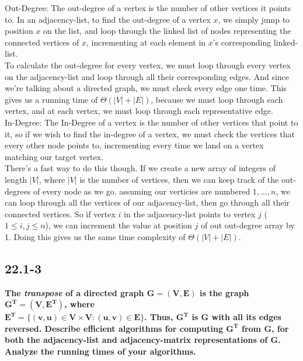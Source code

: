 \documentclass[11pt]{article}
\begin{document}
 Out-Degree: The out-degree of a vertex is the number of other vertices it points to.  In an 
 adjacency-list, to find the out-degree of a vertex $x$, we simply jump to position $x$ on the 
 list, and loop through the linked list of nodes representing the connected vertices of $x$, 
 incrementing at each element in $x$'s corresponding linked-list. \\

 To calculate the out-degree for every vertex, we must loop through every vertex on the 
 adjacency-list and loop through all their corresponding edges.  And since we're talking about a 
 directed graph, we must check every edge one time.  This gives us a running time of 
 \(\Theta(|V| + |E|)\), because we must loop through each vertex, and at each vertex, we must 
 loop through each representative edge. \\

 In-Degree: The In-Degree of a vertex is the number of other vertices that point to it, so if we 
 wish to find the in-degree of a vertex, we must check the vertices that every other node points 
 to, incrementing every time we land on a vertex matching our target vertex.  \\ 

 There's a fast way to do this though.  If we create a new array of integers of length $|V|$, where 
 $|V|$ is the number of vertices, then we can keep track of the out-degrees of every node as we go. 
 assuming our verticies are numbered $1,\dots,n$, we can loop through all the vertices of our 
 adjacency-list, then go through all their connected vertices.  So if vertex $i$ in the 
 adjacency-list points to vertex $j$ (\(1 \leq i,j \leq n\)), we can increment the value at position 
 $j$ of out out-degree array by 1.  Doing this gives us the same time complexity of 
 \(\Theta(|V| + |E|)\).

 \newpage

 \subsection*{22.1-3}
 \textbf{The \textit{transpose} of a directed graph \(\mathbf{G = (V,E)}\) is the graph 
 \(\mathbf{G^T = (V,E^T)}\), where \\ \(\mathbf{E^T = \{(v,u) \in V \times V : (u,v) \in E\}}\). 
 Thus, \(\mathbf{G^T}\) is \(\mathbf G\) with all its edges reversed. Describe efficient 
 algorithms for computing \(\mathbf{G^T}\) from \(\mathbf G\), for both the adjacency-list and 
 adjacency-matrix representations of \(\mathbf G\). Analyze the running times of your algorithms.} \\
\end{document}
